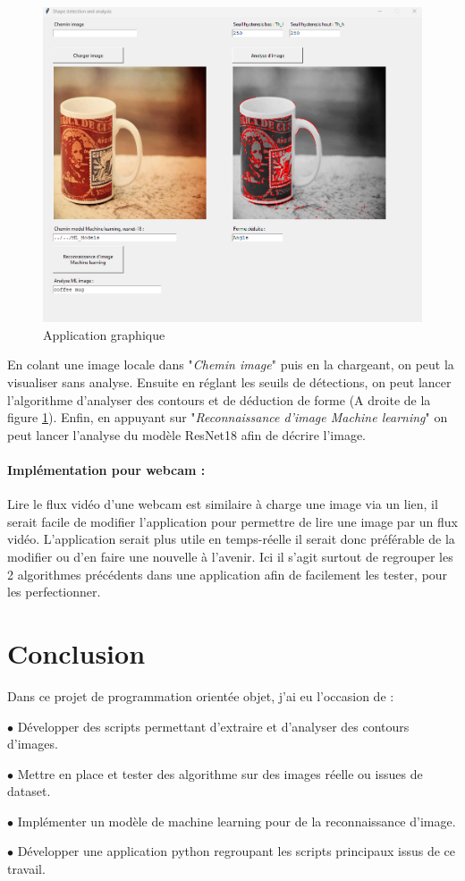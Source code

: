 \begin{figure}[h]
	\centering
	\includegraphics[width=0.8\linewidth]{Figures/Exemple_appli}
	\caption{Application graphique}
	\label{fig:exempleappli}
\end{figure}

En colant une image locale dans "\textit{Chemin image}" puis en la chargeant, on peut la visualiser sans analyse. Ensuite en réglant les seuils de détections, on peut lancer l'algorithme d'analyser des contours et de déduction de forme (A droite de la figure \ref{fig:exempleappli}). Enfin, en appuyant sur "\textit{Reconnaissance d'image Machine learning}" on peut lancer l'analyse du modèle ResNet18 afin de décrire l'image. 

\paragraph{Implémentation pour webcam :} Lire le flux vidéo d'une webcam est similaire à charge une image via un lien, il serait facile de modifier l'application pour permettre de lire une image par un flux vidéo. L'application serait plus utile en temps-réelle il serait donc préférable de la modifier ou d'en faire une nouvelle à l'avenir. Ici il s'agit surtout de regrouper les 2 algorithmes précédents dans une application afin de facilement les tester, pour les perfectionner.

\clearpage
\section{Conclusion}

Dans ce projet de programmation orientée objet, j'ai eu l'occasion de :
\begin{itemizeFB}
	\item[$\bullet$]  Développer des scripts permettant d'extraire et d'analyser des contours d'images.
	\item[$\bullet$] Mettre en place et tester des algorithme sur des images réelle ou issues de dataset.
	\item[$\bullet$] Implémenter un modèle de machine learning pour de la reconnaissance d'image.
	\item[$\bullet$] Développer une application python regroupant les scripts principaux issus de ce travail.
\end{itemizeFB}

